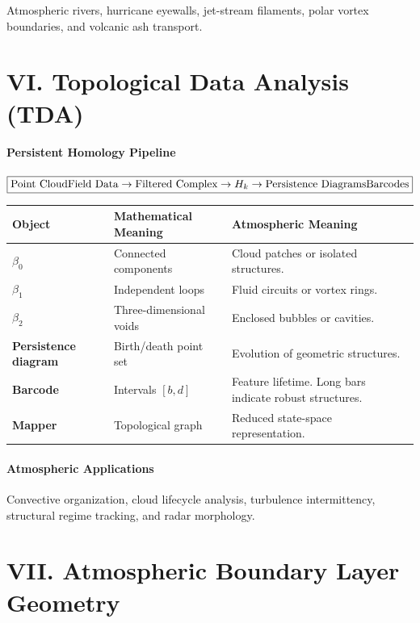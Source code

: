 \documentclass[11pt]{article}
\begin{document}
Atmospheric rivers, hurricane eyewalls, jet-stream filaments,
polar vortex boundaries, and volcanic ash transport.

\section*{VI. Topological Data Analysis (TDA)}

\paragraph{Persistent Homology Pipeline}

\[
\boxed{
\text{Point Cloud\/Field Data}
\rightarrow
\text{Filtered Complex}
\rightarrow
H_k
\rightarrow
\text{Persistence Diagrams\/Barcodes}
}
\]

\begin{longtable}{>{\bfseries}p{}p{}p{}}
Object & Mathematical Meaning & Atmospheric Meaning\\
\midrule

$\beta_0$ &
Connected components &
Cloud patches or isolated structures.\\

$\beta_1$ &
Independent loops &
Fluid circuits or vortex rings.\\

$\beta_2$ &
Three-dimensional voids &
Enclosed bubbles or cavities.\\

Persistence diagram &
Birth/death point set &
Evolution of geometric structures.\\

Barcode &
Intervals $[b,d]$ &
Feature lifetime. Long bars indicate robust structures.\\

Mapper &
Topological graph &
Reduced state-space representation.
\end{longtable}

\paragraph{Atmospheric Applications}

Convective organization, cloud lifecycle analysis, turbulence
intermittency, structural regime tracking, and radar morphology.

\section*{VII. Atmospheric Boundary Layer Geometry}
\end{document}
